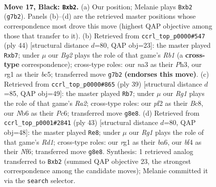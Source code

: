 \documentclass[11pt]{article}
\begin{document}
\clearpage

\begin{figure}[p]\centering
\begin{subfigure}{0.46\textwidth}\centering
\resizebox{\linewidth}{!}{%
\newchessgame
\chessboard[
  setfen={2kr2r1/1pp1pBbp/1nn3p1/p7/5B1P/N4P2/PPP1KP2/R5R1 b - - 0 17},
  showmover=false,
  pgfstyle=straightmove, color=movearrow, markmove={g7-b2}
]}
\caption{}
\end{subfigure}\hfill
\begin{subfigure}{0.46\textwidth}\centering
\resizebox{\linewidth}{!}{%
\newchessgame
\chessboard[
  setfen={r1r3k1/1p1b1ppp/4pn2/2b5/P1P5/P1N4P/2B1NPP1/RR4K1 w - - 0 23},
  showmover=false,
  pgfstyle=straightmove, color=movearrow, markmove={b1-b7}
]}
\caption{}
\end{subfigure}
\\[4pt]
\begin{subfigure}{0.46\textwidth}\centering
\resizebox{\linewidth}{!}{%
\newchessgame
\chessboard[
  setfen={2b1r1k1/r3bpp1/1Bp1pn1p/p7/N1BP4/8/PP3PPP/2R1R1K1 b - - 1 20},
  showmover=false,
  pgfstyle=straightmove, color=movearrow, markmove={a7-b7}
]}
\caption{}
\end{subfigure}\hfill
\begin{subfigure}{0.46\textwidth}\centering
\resizebox{\linewidth}{!}{%
\newchessgame
\chessboard[
  setfen={3r1kr1/p1Bp1p2/Bpn2n1p/2p3p1/4P3/8/PP3PPP/2KRR3 b - - 1 22},
  showmover=false,
  pgfstyle=straightmove, color=movearrow, markmove={d8-e8}
]}
\caption{}
\end{subfigure}
\caption{\textbf{Move 17, Black: \texttt{Bxb2}.} (a) Our position; Melanie plays \texttt{Bxb2} (\texttt{g7b2}). Panels (b)--(d) are the retrieved master positions whose correspondence most drove this move (highest QAP objective among those that transfer to it). (b) Retrieved from \texttt{ccrl\_top\_p0000\#547} (ply 44) [structural distance $d$=80, QAP obj=23]: the master played \texttt{Rxb7}; under $\mu$ our \emph{Bg2} plays the role of that game's \emph{Rb1} (a \textbf{cross-type} correspondence); cross-type roles: our \emph{n}a3 as their \emph{P}h3, our \emph{r}g1 as their \emph{b}c5; transferred move \texttt{g7b2} \textbf{(endorses this move)}. (c) Retrieved from \texttt{ccrl\_top\_p0000\#865} (ply 39) [structural distance $d$=85, QAP obj=49]: the master played \texttt{Rb7}; under $\mu$ our \emph{Rg1} plays the role of that game's \emph{Ra2}; cross-type roles: our \emph{p}f2 as their \emph{B}c8, our \emph{N}b6 as their \emph{P}c6; transferred move \texttt{g8e8}. (d) Retrieved from \texttt{ccrl\_top\_p0001\#2841} (ply 43) [structural distance $d$=80, QAP obj=48]: the master played \texttt{Re8}; under $\mu$ our \emph{Rg1} plays the role of that game's \emph{Rd1}; cross-type roles: our \emph{r}g1 as their \emph{b}a6, our \emph{b}f4 as their \emph{N}f6; transferred move \texttt{g8e8}. Synthesis: 1 retrieved analog transferred to \texttt{Bxb2} (summed QAP objective 23, the strongest correspondence among the candidate moves); Melanie committed it via the \texttt{search} selector.}
\label{fig:thought-m33}
\end{figure}
\end{document}
